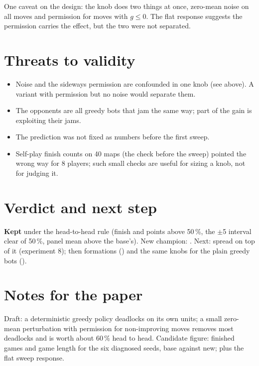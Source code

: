 \documentclass{../polyexp}
\begin{document}
One caveat on the design: the knob does two things at once, zero-mean noise on all moves and permission for moves with $g\le 0$. The flat response suggests the permission carries the effect, but the two were not separated.


\section{Threats to validity}
\begin{itemize}
\item Noise and the sideways permission are confounded in one knob (see above). A variant with permission but no noise would separate them.
\item The opponents are all greedy bots that jam the same way; part of the gain is exploiting their jams.
\item The prediction was not fixed as numbers before the first sweep.
\item Self-play finish counts on 40 maps (the check before the sweep) pointed the wrong way for 8 players; such small checks are useful for sizing a knob, not for judging it.
\end{itemize}

\section{Verdict and next step}
\textbf{Kept} under the head-to-head rule (finish and points above 50\,\%, the $\pm$5 interval clear of 50\,\%, panel mean above the base's). New champion: . Next: spread on top of it (experiment 8); then formations () and the same knobs for the plain greedy bots ().

\section{Notes for the paper}
Draft: a deterministic greedy policy deadlocks on its own units; a small zero-mean perturbation with permission for non-improving moves removes most deadlocks and is worth about 60\,\% head to head. Candidate figure: finished games and game length for the six diagnosed seeds, base against new; plus the flat sweep response.

\end{document}
